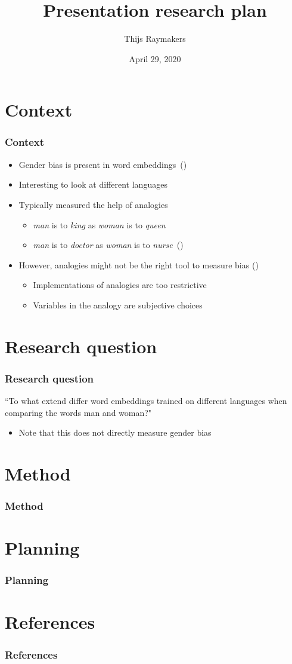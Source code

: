 \documentclass{beamer}
\author{Thijs Raymakers}
\title{Presentation research plan}
\date{April 29, 2020}
\newcommand{\bcite}[1]{(\cite{#1})}
\begin{document}
\section{Context}
\begin{frame}
\frametitle{Context}
\begin{itemize}
    \item Gender bias is present in word embeddings~\bcite{bolukbasi_2016_quantifying_stereotypes}
    \pause
    \item Interesting to look at different languages
    \pause
    \item Typically measured the help of analogies
    \begin{itemize}
        \item \textit{man} is to \textit{king} as \textit{woman} is to \textit{queen}
        \item \textit{man} is to \textit{doctor} as \textit{woman} is to \textit{nurse}~\bcite{bolukbasi_2016_quantifying_stereotypes}
    \end{itemize}
    \pause
    \item However, analogies might not be the right tool to measure bias \bcite{2019arXiv190509866N}
    \begin{itemize}
        \item Implementations of analogies are too restrictive
        \item Variables in the analogy are subjective choices
    \end{itemize}
\end{itemize}
\end{frame}

\section{Research question}
\begin{frame}
\frametitle{Research question}

``To what extend differ word embeddings trained on different languages when comparing
the words man and woman?"

\pause
\begin{itemize}
    \item Note that this does not directly measure gender bias
\end{itemize}

\end{frame}

\section{Method}
\begin{frame}
\frametitle{Method}
\end{frame}

\section{Planning}
\begin{frame}
\frametitle{Planning}
\end{frame}

\section{References}
\begin{frame}[allowframebreaks]
\frametitle{References}
\printbibliography[heading=none]
\end{frame}
\end{document}
